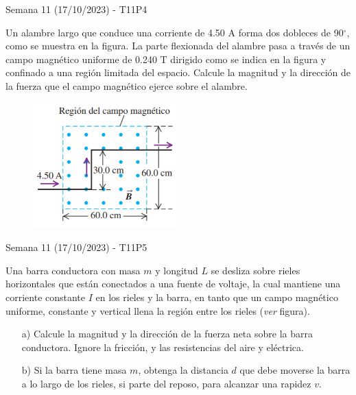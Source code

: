 \begin{frame}{Semana 11 (17/10/2023) - T11P4}

    Un alambre largo que
conduce una corriente de 4.50 A
forma dos dobleces de 90$^\circ$, como
se muestra en la figura.
La parte flexionada del alambre
pasa a través de un campo magnético uniforme de 0.240 T dirigido como se indica en la
figura y confinado a una región
limitada del espacio. Calcule 
la magnitud y la dirección de la
fuerza que el campo magnético
ejerce sobre el alambre.

\begin{figure}
    \centering
    \includegraphics[width=0.5\textwidth]{figures/t10p1.png}
\end{figure}
    
\end{frame}

\begin{frame}{Semana 11 (17/10/2023) - T11P5}

    Una barra conductora con masa $m$ y longitud $L$ se desliza sobre rieles horizontales que
están conectados a una fuente de voltaje, la cual mantiene una corriente constante $I$ en los rieles y la barra, en tanto que un campo magnético
uniforme, constante y vertical llena la región entre los rieles (\textit{ver} figura).

\begin{itemize}
    \item[a)] Calcule la magnitud y la dirección de la fuerza neta sobre
la barra conductora. Ignore la fricción, y las resistencias del aire y
eléctrica.
    \item[b)] Si la barra tiene masa $m$, obtenga la distancia $d$ que debe
moverse la barra a lo largo de los rieles, si parte del reposo, para alcanzar una rapidez $v$.
\end{itemize}
    
\end{frame}

